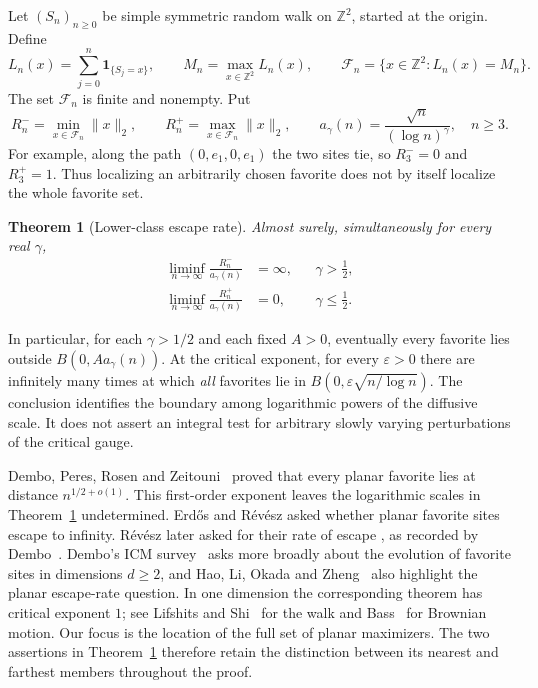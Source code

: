 \documentclass[12pt,reqno]{amsart}
\theoremstyle{plain}
\newtheorem{theorem}{Theorem}[section]
\theoremstyle{definition}
\theoremstyle{remark}
\numberwithin{equation}{section}
\begin{document}
Let $(S_n)_{n\ge0}$ be simple symmetric random walk on $\mathbb Z^2$, started
at the origin. Define
\begin{equation}\label{eq:local-time-definition}
 L_n(x)=\sum_{j=0}^n\mathbf1_{\{S_j=x\}},\qquad
 M_n=\max_{x\in\mathbb Z^2}L_n(x),\qquad
 \mathcal F_n=\{x\in\mathbb Z^2:L_n(x)=M_n\}.
\end{equation}
The set $\mathcal F_n$ is finite and nonempty. Put
\begin{equation}\label{eq:radii-definition}
 R_n^- =\min_{x\in\mathcal F_n}\|x\|_2,\qquad
 R_n^+ =\max_{x\in\mathcal F_n}\|x\|_2,
 \qquad
 a_\gamma(n)=\frac{\sqrt n}{(\log n)^\gamma},\quad n\ge3.
\end{equation}
For example, along the path $(0,e_1,0,e_1)$ the two sites tie, so
$R_3^-=0$ and $R_3^+=1$. Thus localizing an arbitrarily chosen favorite
does not by itself localize the whole favorite set.

\begin{theorem}[Lower-class escape rate]\label{main:precise-escape-rate}
Almost surely, simultaneously for every real $\gamma$,
\begin{align}
 \liminf_{n\to\infty}\frac{R_n^-}{a_\gamma(n)}
 &=\infty, &&\gamma>\tfrac12,\label{eq:main-escape}\\
 \liminf_{n\to\infty}\frac{R_n^+}{a_\gamma(n)}
 &=0, &&\gamma\le\tfrac12.\label{eq:main-recurrence}
\end{align}
\end{theorem}

In particular, for each $\gamma>1/2$ and each fixed $A>0$, eventually
every favorite lies outside $B(0,Aa_\gamma(n))$. At the critical exponent,
for every $\varepsilon>0$ there are infinitely many times at which
\emph{all} favorites lie in $B(0,\varepsilon\sqrt{n/\log n})$.
The conclusion identifies the boundary among logarithmic powers of the
diffusive scale. It does not assert an integral test for arbitrary slowly
varying perturbations of the critical gauge.

Dembo, Peres, Rosen and Zeitouni~\cite[Theorem~1.1]{DPRZ2001} proved that
every planar favorite lies at distance $n^{1/2+o(1)}$. This first-order
exponent leaves the logarithmic scales in Theorem~\ref{main:precise-escape-rate}
undetermined. Erd\H{o}s and R\'ev\'esz
\cite[Question~14]{ErdosRevesz1987} asked whether planar favorite sites
escape to infinity. R\'ev\'esz later asked for their rate of escape
\cite[Chap.~19]{Revesz1990}, as recorded by Dembo~\cite[p.~6]{Dembo2005}.
Dembo's ICM survey~\cite[Open Problem~2.1]{Dembo2006} asks more broadly
about the evolution of favorite sites in dimensions $d\ge2$, and Hao,
Li, Okada and Zheng~\cite[Remark~1.4(1)]{HLOZ2025} also highlight the
planar escape-rate question. In one dimension the corresponding theorem
has critical exponent $1$; see Lifshits and Shi~\cite[Theorem~1.1]{LifshitsShi2004}
for the walk and Bass~\cite[Theorem~2.2]{Bass2023} for Brownian motion.
Our focus is the location of the full set of planar maximizers.
The two assertions in Theorem~\ref{main:precise-escape-rate} therefore retain
the distinction between its nearest and farthest members throughout the proof.
\end{document}

